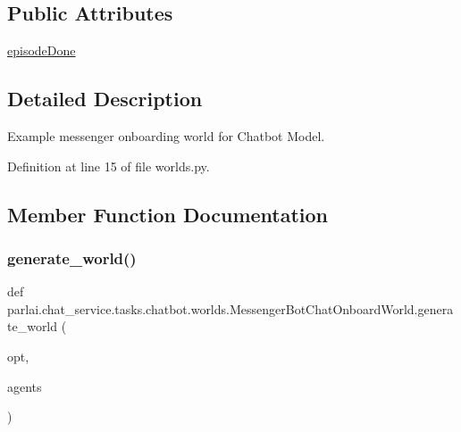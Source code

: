 \subsection*{Public Attributes}
\begin{DoxyCompactItemize}
\item 
\hyperlink{classparlai_1_1chat__service_1_1tasks_1_1chatbot_1_1worlds_1_1MessengerBotChatOnboardWorld_afbc08c61e0d6b544f67d9b91f849e380}{episode\+Done}
\end{DoxyCompactItemize}


\subsection{Detailed Description}
\begin{DoxyVerb}Example messenger onboarding world for Chatbot Model.
\end{DoxyVerb}
 

Definition at line 15 of file worlds.\+py.



\subsection{Member Function Documentation}
\mbox{\label{classparlai_1_1chat__service_1_1tasks_1_1chatbot_1_1worlds_1_1MessengerBotChatOnboardWorld_aa9eda82599dfd4735b207fbf5434251f}} 
\subsubsection{\texorpdfstring{generate\+\_\+world()}{generate\_world()}}
{\footnotesize\ttfamily def parlai.\+chat\+\_\+service.\+tasks.\+chatbot.\+worlds.\+Messenger\+Bot\+Chat\+Onboard\+World.\+generate\+\_\+world (\begin{DoxyParamCaption}\item[{}]{opt,  }\item[{}]{agents }\end{DoxyParamCaption})\hspace{0.3cm}{\ttfamily [static]}}



